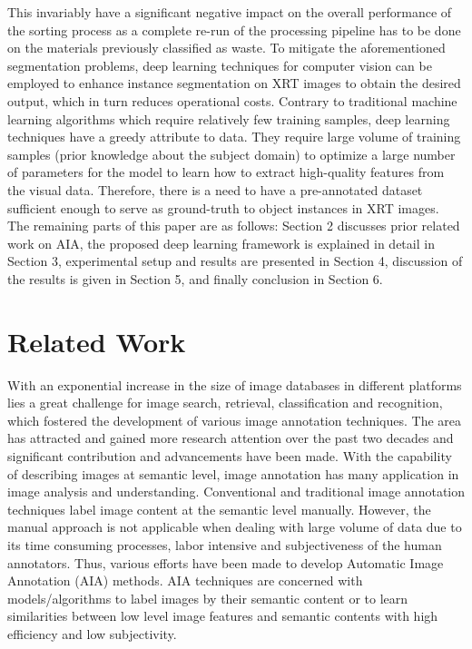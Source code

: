 \documentclass[conference]{IEEEtran}
\begin{document}
	This invariably have a significant
negative impact on the overall performance of the sorting process as a complete re-run of
the processing pipeline has to be done on the materials previously classified as waste. To
mitigate the aforementioned segmentation problems, deep learning techniques for computer vision can be employed to enhance instance segmentation on XRT images to obtain the
desired output, which in turn reduces operational costs. Contrary to traditional machine
learning algorithms which require relatively few training samples, deep learning techniques
have a greedy attribute to data. They require large volume of training samples
(prior knowledge about the subject domain) to optimize a large number of parameters for the
model to learn how to extract high-quality features from the visual data. Therefore, there is a need
to have a pre-annotated dataset sufficient enough to serve as ground-truth to
object instances in XRT images.\\

 The remaining parts of this paper are as follows: Section 2 discusses prior related work on AIA, the proposed deep learning framework 
 is explained in detail in Section 3, experimental setup and results are presented in Section 4, discussion of the results is given in Section 5,
 and finally conclusion in Section 6.

\section{Related Work}

 	With an exponential increase
in the size of image databases in different platforms lies a great challenge for image search,
retrieval, classification and recognition, which fostered the development of various image annotation techniques. The area has attracted and gained more research attention
over the past two decades and significant contribution and advancements have been made.
With the capability of describing images at semantic level, image annotation has many application in image analysis and understanding. Conventional and traditional image
annotation techniques label image content at the semantic level manually. However, the
manual approach is not applicable when dealing with large volume of data due to its time
consuming processes, labor intensive and subjectiveness of the human annotators. Thus,
various efforts have been made to develop Automatic Image Annotation (AIA)
methods. AIA techniques are concerned with models/algorithms to label images by their
semantic content or to learn similarities between low level image features and semantic
contents with high efficiency and low subjectivity.\\
 	
\end{document}
